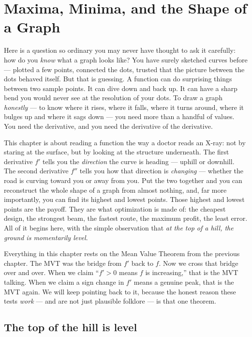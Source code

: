 \chapter{Maxima, Minima, and the Shape of a Graph}

Here is a question so ordinary you may never have thought to ask it carefully:
how do you \emph{know} what a graph looks like? You have surely sketched curves
before --- plotted a few points, connected the dots, trusted that the picture
between the dots behaved itself. But that is guessing. A function can do
surprising things between two sample points. It can dive down and back up. It can
have a sharp bend you would never see at the resolution of your dots. To draw a
graph \emph{honestly} --- to know where it rises, where it falls, where it turns
around, where it bulges up and where it sags down --- you need more than a handful
of values. You need the derivative, and you need the derivative of the derivative.

This chapter is about reading a function the way a doctor reads an X-ray: not by
staring at the surface, but by looking at the structure underneath. The first
derivative $f'$ tells you the \emph{direction} the curve is heading --- uphill or
downhill. The second derivative $f''$ tells you how that direction is
\emph{changing} --- whether the road is curving toward you or away from you. Put
the two together and you can reconstruct the whole shape of a graph from almost
nothing, and, far more importantly, you can find its highest and lowest points.
Those highest and lowest points are the payoff. They are what optimization is made
of: the cheapest design, the strongest beam, the fastest route, the maximum
profit, the least error. All of it begins here, with the simple observation that
\emph{at the top of a hill, the ground is momentarily level}.

Everything in this chapter rests on the Mean Value Theorem from the previous
chapter. The MVT was the bridge from $f'$ back to $f$. Now we cross that bridge
over and over. When we claim ``$f'>0$ means $f$ is increasing,'' that is the MVT
talking. When we claim a sign change in $f'$ means a genuine peak, that is the MVT
again. We will keep pointing back to it, because the honest reason these tests
\emph{work} --- and are not just plausible folklore --- is that one theorem.

\section{The top of the hill is level}

